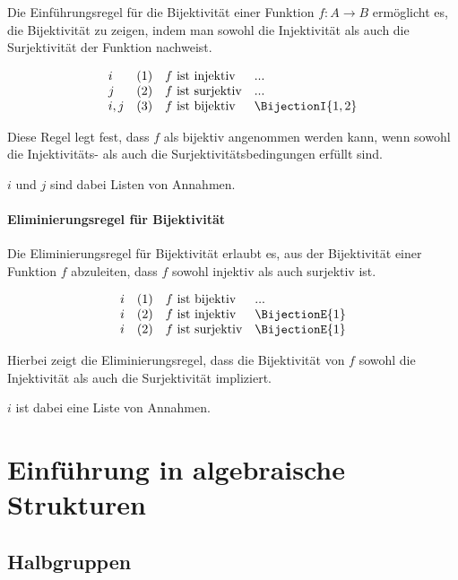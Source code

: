 \documentclass{book}
\theoremstyle{plain}
\theoremstyle{remark}
\theoremstyle{definition}
\begin{document}
Die Einführungsregel für die Bijektivität einer Funktion \( f: A \to B \) ermöglicht es, die Bijektivität zu zeigen, indem man sowohl die Injektivität als auch die Surjektivität der Funktion nachweist.

\[
\begin{array}{llll}
    i       & (1) & f \text{ ist injektiv} & ... \\
    j       & (2) & f \text{ ist surjektiv} & ... \\
    i,j     & (3) & f \text{ ist bijektiv} & \BijectionI{1,2}
\end{array}
\]

Diese Regel legt fest, dass \( f \) als bijektiv angenommen werden kann, wenn sowohl die Injektivitäts- als auch die Surjektivitätsbedingungen erfüllt sind.

\(i\) und \(j\) sind dabei Listen von Annahmen.

\subsubsection*{Eliminierungsregel für Bijektivität}
\label{rule:BijectionE}

Die Eliminierungsregel für Bijektivität erlaubt es, aus der Bijektivität einer Funktion \( f \) abzuleiten, dass \( f \) sowohl injektiv als auch surjektiv ist.

\[
\begin{array}{llll}
    i       & (1) & f \text{ ist bijektiv} & ... \\
    i       & (2) & f \text{ ist injektiv} & \BijectionE{1}\\
    i       & (2) & f \text{ ist surjektiv} & \BijectionE{1}
\end{array}
\]

Hierbei zeigt die Eliminierungsregel, dass die Bijektivität von \( f \) sowohl die Injektivität als auch die Surjektivität impliziert.

\(i\) ist dabei eine Liste von Annahmen.

\chapter{Einführung in algebraische Strukturen}

\section{Halbgruppen}
\end{document}
